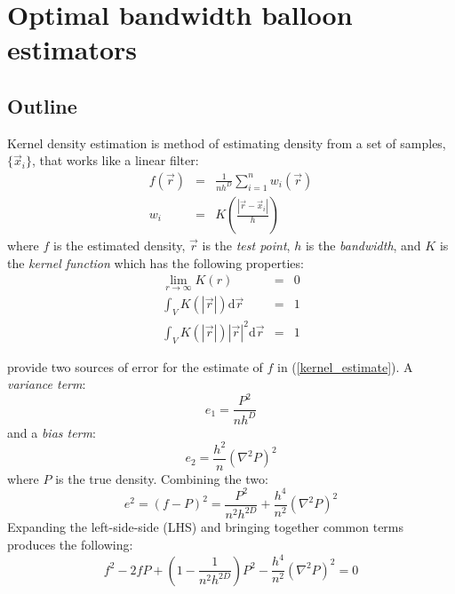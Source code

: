 


%

%

\section{Optimal bandwidth balloon estimators}

\subsection{Outline}

Kernel density estimation is method of estimating density from a set of samples,
$\lbrace \vec x_i \rbrace$, that works like a linear filter:
\begin{eqnarray}
f(\vec r) & = & \frac{1}{n h^D} \sum_{i=1}^{n} w_i(\vec r) \label{kernel_estimate}\\
w_i & = & K\left(\frac{|\vec r - \vec x_i|}{h}\right)
\end{eqnarray}
where $f$ is the estimated density, $\vec r$ is the {\it test point},
$h$ is the {\it bandwidth},
and $K$ is the {\it kernel function} which has the following properties:
\begin{eqnarray}
\lim_{r \rightarrow \infty} K(r) & = & 0 \\
\int_V K(|\vec r|) \mathrm d \vec r & = & 1 \\
\int_V K(|\vec r|) |\vec r|^2 \mathrm d \vec r & = & 1 
\end{eqnarray}

\citet{Terrell_Scott1992} provide two sources of error for the estimate
of $f$ in (\ref{kernel_estimate}). A {\it variance term}:
\begin{equation}
e_1 = \frac{P^2}{n h^D}
\end{equation}
and a {\it bias term}:
\begin{equation}
e_2 = \frac{h^2}{n} \left ( \nabla^2 P \right )^2
\end{equation}
where $P$ is the true density.
Combining the two:
\begin{equation}
e^2 = (f - P)^2 = \frac{P^2}{n^2 h^{2 D}} + \frac{h^4}{n^2} \left ( \nabla^2 P \right )^2
\end{equation}
Expanding the left-side-side (LHS) and bringing together common terms produces 
the following:
\begin{equation}
f^2 - 2 f P + \left (1 - \frac{1}{n^2 h^{2 D}} \right ) P^2 - \frac{h^4}{n^2} 
	\left ( \nabla^2 P \right )^2 = 0
\label{basic_equation}
\end{equation}

